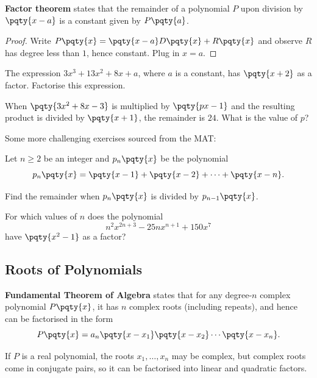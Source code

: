 \documentclass{article}
\begin{document}
\textbf{Factor theorem} states that the remainder of a polynomial \(P\) upon division by \(\pqty{x - a}\) is a constant given by \(P\pqty{a}\).

\begin{proof}
    Write \(P\pqty{x} = \pqty{x - a} D\pqty{x} + R\pqty{x}\) and observe \(R\) has degree less than \(1\), hence constant. Plug in \(x = a\).
\end{proof}

\begin{example}[TMUA 2016 P1 Q2]
    The expression \(3 x^3 + 13 x^2 + 8x + a\), where \(a\) is a constant, has \(\pqty{x + 2}\) as a factor. Factorise this expression.
\end{example}

\begin{example}[TMUA 2017 P1 Q4]
    When \(\pqty{3 x^2 + 8x - 3}\) is multiplied by \(\pqty{px - 1}\) and the resulting product is divided by \(\pqty{x + 1}\), the remainder is \(24\). What is the value of \(p\)?
\end{example}

Some more challenging exercises sourced from the MAT:

\begin{example}
    Let \(n \geq 2\) be an integer and \(p_n \pqty{x}\) be the polynomial
    \[
        p_n \pqty{x} = \pqty{x - 1} + \pqty{x - 2} + \cdots + \pqty{x - n}.
    \]

    Find the remainder when \(p_n \pqty{x}\) is divided by \(p_{n - 1} \pqty{x}\).
\end{example}

\begin{example}
    For which values of \(n\) does the polynomial
    \[
        n^2 x^{2n + 3} - 25 n x^{n + 1} + 150 x^7
    \]
    have \(\pqty{x^2 - 1}\) as a factor?
\end{example}

\subsection{Roots of Polynomials}
\textbf{Fundamental Theorem of Algebra} states that for any degree-\(n\) complex polynomial \(P\pqty{x}\), it has \(n\) complex roots (including repeats), and hence can be factorised in the form
\[
    P\pqty{x} = a_n \pqty{x - x_1} \pqty{x - x_2} \cdots \pqty{x - x_n}.
\]

If \(P\) is a real polynomial, the roots \(x_1, \ldots, x_n\) may be complex, but complex roots come in conjugate pairs, so it can be factorised into linear and quadratic factors.
\end{document}
